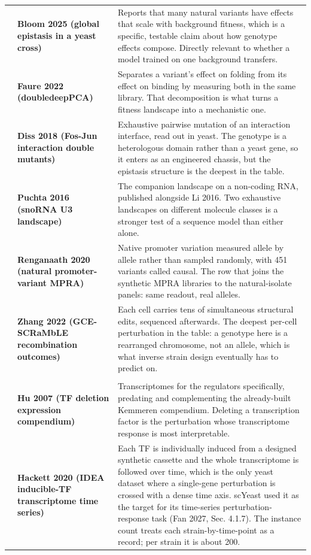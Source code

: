 \begin{longtable}{@{}r@{\hspace{4pt}} L{46mm} L{112mm}@{}}
 & \textbf{Bloom 2025 (global epistasis in a yeast cross)} & Reports that many natural variants have effects that scale with background fitness, which is a specific, testable claim about how genotype effects compose. Directly relevant to whether a model trained on one background transfers. \\
 & \textbf{Faure 2022 (doubledeepPCA)} & Separates a variant's effect on folding from its effect on binding by measuring both in the same library. That decomposition is what turns a fitness landscape into a mechanistic one. \\
 & \textbf{Diss 2018 (Fos-Jun interaction double mutants)} & Exhaustive pairwise mutation of an interaction interface, read out in yeast. The genotype is a heterologous domain rather than a yeast gene, so it enters as an engineered chassis, but the epistasis structure is the deepest in the table. \\
 & \textbf{Puchta 2016 (snoRNA U3 landscape)} & The companion landscape on a non-coding RNA, published alongside Li 2016. Two exhaustive landscapes on different molecule classes is a stronger test of a sequence model than either alone. \\
 & \textbf{Renganaath 2020 (natural promoter-variant MPRA)} & Native promoter variation measured allele by allele rather than sampled randomly, with 451 variants called causal. The row that joins the synthetic MPRA libraries to the natural-isolate panels: same readout, real alleles. \\
 & \textbf{Zhang 2022 (GCE-SCRaMbLE recombination outcomes)} & Each cell carries tens of simultaneous structural edits, sequenced afterwards. The deepest per-cell perturbation in the table: a genotype here is a rearranged chromosome, not an allele, which is what inverse strain design eventually has to predict on. \\
\addlinespace[5pt]
\addlinespace[4pt]
\\
 & \textbf{Hu 2007 (TF deletion expression compendium)} & Transcriptomes for the regulators specifically, predating and complementing the already-built Kemmeren compendium. Deleting a transcription factor is the perturbation whose transcriptome response is most interpretable. \\
 & \textbf{Hackett 2020 (IDEA inducible-TF transcriptome time series)} & Each TF is individually induced from a designed synthetic cassette and the whole transcriptome is followed over time, which is the only yeast dataset where a single-gene perturbation is crossed with a dense time axis. scYeast used it as the target for its time-series perturbation-response task (Fan 2027, Sec. 4.1.7). The instance count treats each strain-by-time-point as a record; per strain it is about 200. \\

\end{longtable}
